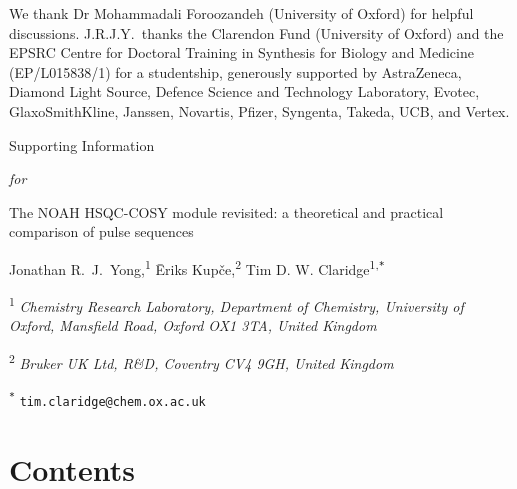 \documentclass[a4paper,12pt]{article}
\newcommand{\me}{Jonathan R.\ J.\ Yong}
\newcommand{\meshort}{J.R.J.Y.}
\newcommand{\eriks}{{\=E}riks Kup{\v{c}}e}
\newcommand{\tim}{Tim D. W. Claridge}
\newcommand{\articletitle}{\todo{The NOAH HSQC-COSY module revisited: a theoretical and practical comparison of pulse sequences}}
\newcommand{\crl}{Chemistry Research Laboratory, Department of Chemistry, University of Oxford, Mansfield Road, Oxford OX1 3TA, United Kingdom}
\newcommand{\brukeruk}{Bruker UK Ltd, R\&D, Coventry CV4 9GH, United Kingdom}
\newcommand{\todo}[1]{{\color{OrangeRed}#1}}
\begin{document}
\begin{refsection}
We thank Dr Mohammadali Foroozandeh (University of Oxford) for helpful discussions.
\meshort{}\ thanks the Clarendon Fund (University of Oxford) and the EPSRC Centre for Doctoral Training in Synthesis for Biology and Medicine (EP/L015838/1) for a studentship, generously supported by AstraZeneca, Diamond Light Source, Defence Science and Technology Laboratory, Evotec, GlaxoSmithKline, Janssen, Novartis, Pfizer, Syngenta, Takeda, UCB, and Vertex.

\AtNextBibliography{\small}
\printbibliography{}
\end{refsection}



\clearpage
\begin{refsection}
\newcommand{\sectionbreak}{\clearpage}
\renewcommand*{\thefigure}{S\arabic{figure}}
\renewcommand*{\thesection}{S\arabic{section}}
\renewcommand*{\thetable}{S\arabic{table}}
\renewcommand*{\thepage}{S\arabic{page}}
\setcounter{page}{1}
\setcounter{figure}{0}
\setcounter{section}{0}
\setcounter{table}{0}
\onehalfspacing

\hspace{0pt}
\vfill
\begin{center}
    \huge
    Supporting Information

    \vspace{0.3cm}

    \textit{for}

    \vspace{0.3cm}

    \articletitle{}

    \vspace{0.6cm}

    \Large \me{},\textsuperscript{1} \eriks{},\textsuperscript{2} \tim{}\textsuperscript{1,\texttt{*}}

    \vspace{0.6cm}

    \large \textsuperscript{1} \textit{\crl{}}

    \textsuperscript{2} \textit{\brukeruk{}}

    \textsuperscript{\texttt{*}} \texttt{tim.claridge@chem.ox.ac.uk}

\end{center}
\vfill

\newpage
\section*{Contents}


\end{refsection}
\end{document}
